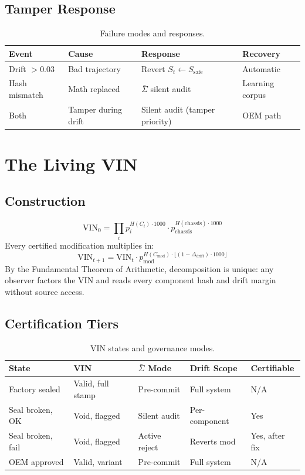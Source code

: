 \documentclass[12pt,letterpaper]{article}
\begin{document}
\subsection{Tamper Response}
\begin{table}[H]\centering
\caption{Failure modes and responses.}
\begin{tabular}{llll}\toprule
\textbf{Event} & \textbf{Cause} & \textbf{Response} & \textbf{Recovery}\\\midrule
Drift $>0.03$ & Bad trajectory & Revert $S_t\leftarrow S_{\mathrm{safe}}$ & Automatic\\
Hash mismatch & Math replaced & $\bar\Sigma$ silent audit & Learning corpus\\
Both & Tamper during drift & Silent audit (tamper priority) & OEM path\\
\bottomrule\end{tabular}
\end{table}

\section{The Living VIN}\label{sec:vin}

\subsection{Construction}
\begin{equation}
  \mathrm{VIN}_0=\prod_i p_i^{H(C_i)\cdot 1000}\cdot p_{\mathrm{chassis}}^{H(\mathrm{chassis})\cdot 1000}
  \label{eq:vin0}
\end{equation}
Every certified modification multiplies in:
\begin{equation}
  \mathrm{VIN}_{t+1}=\mathrm{VIN}_t\cdot p_{\mathrm{mod}}^{H(C_{\mathrm{mod}})\cdot\lfloor(1-\Delta_{\mathrm{drift}})\cdot 1000\rfloor}
  \label{eq:vinupdate}
\end{equation}
By the Fundamental Theorem of Arithmetic, decomposition is unique:
any observer factors the VIN and reads every component hash and drift
margin without source access.

\subsection{Certification Tiers}
\begin{table}[H]\centering
\caption{VIN states and governance modes.}
\begin{tabular}{lllll}\toprule
\textbf{State}&\textbf{VIN}&\textbf{$\bar\Sigma$ Mode}&\textbf{Drift Scope}&\textbf{Certifiable}\\\midrule
Factory sealed   &Valid, full stamp  &Pre-commit   &Full system  &N/A\\
Seal broken, OK  &Void, flagged      &Silent audit &Per-component&Yes\\
Seal broken, fail&Void, flagged      &Active reject&Reverts mod  &Yes, after fix\\
OEM approved     &Valid, variant     &Pre-commit   &Full system  &N/A\\
\bottomrule\end{tabular}
\end{table}
\end{document}
